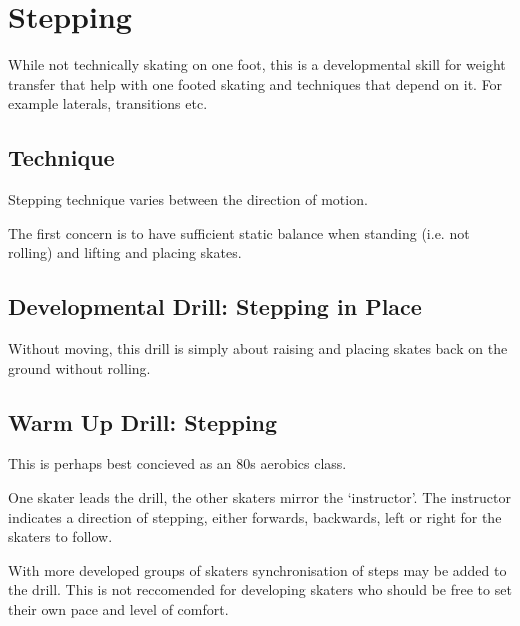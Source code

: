 \section{Stepping}
While not technically skating on one foot, this is a developmental skill for weight transfer that help with one footed skating and techniques that depend on it. For example laterals, transitions etc.   


\subsection*{Technique}

Stepping technique varies between the direction of motion. 

The first concern is to have sufficient static balance when standing (i.e. not rolling) and lifting and placing skates.  



\subsection*{Developmental Drill: Stepping in Place} 
\label{drill:one_foot/stepping/in_place}
Without moving, this drill is simply about raising and placing skates back on the ground without rolling.


\subsection*{Warm Up Drill: Stepping} 
\label{drill:one_foot/stepping/warm_up}

This is perhaps best concieved as an 80s aerobics class.

One skater leads the drill, the other skaters mirror the `instructor'.
The instructor indicates a direction of stepping, either forwards, backwards, left or right for the skaters to follow.


With more developed groups of skaters synchronisation of steps may be added to the drill. This is not reccomended for developing skaters who should be free to set their own pace and level of comfort.



